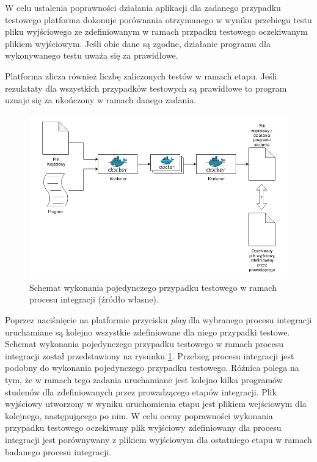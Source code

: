 W celu ustalenia poprawności działania aplikacji dla zadanego przypadku testowego platforma dokonuje porównania otrzymanego w wyniku przebiegu testu pliku wyjściowego ze zdefiniowanym w ramach przpadku testowego oczekiwanym plikiem wyjściowym.
Jeśli obie dane są zgodne, działanie programu dla wykonywanego testu uważa się za prawidłowe.

Platforma zlicza również liczbę zaliczonych testów w ramach etapu.
Jeśli rezulataty dla wszystkich przypadków testowych są prawidłowe to program uznaje się za ukończony w ramach danego zadania.

\begin{figure}[h]
    \centering
    \includegraphics[width = 12cm]{chapter02/integration.png}
    \caption{Schemat wykonania pojedynczego przypadku testowego w ramach procesu integracji (źródło własne).}
    \label{fig:integration}
\end{figure}

Poprzez naciśnięcie na platformie przycisku \textit{play} dla wybranego procesu integracji uruchamiane są kolejno wszystkie zdefiniowane dla niego przypadki testowe.
Schemat wykonania pojedynczego przypadku testowego w ramach procesu integracji został przedstawiony na rysunku \ref{fig:integration}.
Przebieg procesu integracji jest podobny do wykonania pojedynczego przypadku testowego.
Różnica polega na tym, że w ramach tego zadania uruchamiane jest kolejno kilka programów studenów dla zdefiniowanych przez prowadzącego etapów integracji.
Plik wyjściowy utworzony w wyniku uruchomienia etapu jest plikiem wejściowym dla kolejnego, następującego po nim.
W celu oceny poprawności wykonania przypadku testowego oczekiwany plik wyjściowy zdefiniowany dla procesu integracji jest porównywany z plikiem wyjściowym dla ostatniego etapu w ramach badanego procesu integracji.


